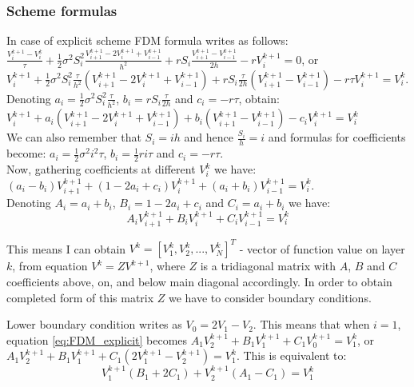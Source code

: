 \documentclass[11pt]{article} %
\begin{document}
\subsubsection{Scheme formulas}
In case of explicit scheme FDM formula writes as follows:\\
$\frac{V_i^{k+1}-V_i^k}{\tau} + \frac{1}{2}\sigma^2 S_i^2 \frac{V_{i+1}^{k+1}-2V_{i}^{k+1}+V_{i-1}^{k+1}}{h^2} + r S_i \frac{V_{i+1}^{k+1}-V_{i-1}^{k+1}}{2h}-r V_{i}^{k+1}= 0$, or \\
$V_{i}^{k+1} + \frac{1}{2} \sigma^2 S_i^2 \frac{\tau}{h^2}\left(V_{i+1}^{k+1}-2V_{i}^{k+1}+V_{i-1}^{k+1}\right) + r S_i \frac{\tau}{2h}\left(V_{i+1}^{k+1}-V_{i-1}^{k+1}\right)-r \tau V_{i}^{k+1} = V_{i}^{k}$.\\


Denoting $a_i = \frac{1}{2} \sigma^2 S_i^2 \frac{\tau}{h^2}$, $b_i = r S_i \frac{\tau}{2h}$ and $c_i = -r \tau$, obtain:\\
$V_{i}^{k+1} +a_i \left(V_{i+1}^{k+1}-2V_{i}^{k+1}+V_{i-1}^{k+1}\right) + b_i \left(V_{i+1}^{k+1}-V_{i-1}^{k+1}\right)-c_i V_{i}^{k+1} = V_{i}^{k}$\\


We can also remember that $S_i = ih$ and hence $\frac{S_i}{h} = i$ and formulas for coefficients become: $a_i = \frac{1}{2} \sigma^2 i^2 \tau$, $b_i = \frac{1}{2} r i \tau $ and $c_i = -r \tau$.\\

Now, gathering coefficients at different $V_i^k$ we have:\\
$(a_i - b_i)V_{i+1}^{k+1} + (1-2a_i+c_i)V_{i}^{k+1}+(a_i + b_i)V_{i-1}^{k+1}=V_{i}^{k}$.\\

Denoting $A_i = a_i + b_i$, $B_i = 1-2a_i + c_i$ and $C_i = a_i+b_i$ we have:\\
\begin{equation}\label{eq:FDM_explicit}
A_i V_{i+1}^{k+1} + B_i V_{i}^{k+1}+C_iV_{i-1}^{k+1}=V_{i}^{k}
\end{equation}

This means I can obtain $V^k = [V_1^k, V_2^k, ..., V_N^k]^T$ - vector of function value on layer $k$, from equation $V^k = Z V^{k+1}$, where $Z$ is a tridiagonal matrix with $A$, $B$ and $C$ coefficients above, on, and below main diagonal accordingly. In order to obtain completed form of this matrix $Z$ we have to consider boundary conditions.

Lower boundary condition writes as $V_0 = 2V_1 - V_2$. This means that when $i=1$, equation \ref{eq:FDM_explicit} becomes $A_1 V_{2}^{k+1} + B_1 V_{1}^{k+1}+C_1 V_{0}^{k+1}=V_{1}^{k}$, or $A_1 V_{2}^{k+1} + B_1 V_{1}^{k+1}+C_1 (2V_1^{k+1} - V_2^{k+1})=V_{1}^{k}$. This is equivalent to:\\
\begin{equation}
V_{1}^{k+1} \left(B_1 + 2C_1 \right)+ V_{2}^{k+1} \left( A_1 - C_1 \right)=V_{1}^{k}
\end{equation}
\end{document}
